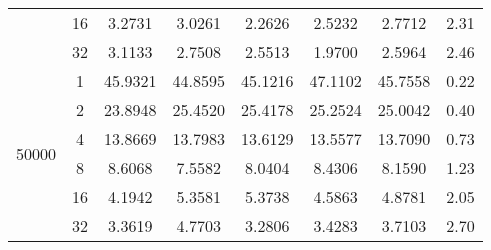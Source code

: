 \begin{tabularx}{\textwidth}{@{} c c c c c c c c @{}}
                               & 16 & 3.2731  & 3.0261  & 2.2626  & 2.5232  & 2.7712  & 2.31 \\
                               & 32 & 3.1133  & 2.7508  & 2.5513  & 1.9700  & 2.5964  & 2.46 \\
    \midrule
        \multirow{6}{*}{50000} & 1  & 45.9321 & 44.8595 & 45.1216 & 47.1102 & 45.7558 & 0.22 \\
                               & 2  & 23.8948 & 25.4520 & 25.4178 & 25.2524 & 25.0042 & 0.40 \\
                               & 4  & 13.8669 & 13.7983 & 13.6129 & 13.5577 & 13.7090 & 0.73 \\
                               & 8  & 8.6068  & 7.5582  & 8.0404  & 8.4306  & 8.1590  & 1.23 \\
                               & 16 & 4.1942  & 5.3581  & 5.3738  & 4.5863  & 4.8781  & 2.05 \\
                               & 32 & 3.3619  & 4.7703  & 3.2806  & 3.4283  & 3.7103  & 2.70 \\
    \bottomrule
\end{tabularx}